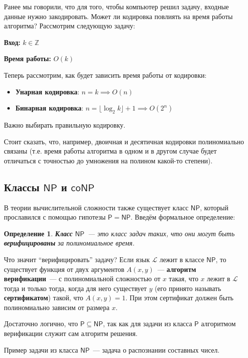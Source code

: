\documentclass[a4paper,12pt]{article}
\newtheorem{definition}{Определение}
\newcommand{\Pclass}{\mathsf{P}}
\newcommand{\NPclass}{\mathsf{NP}}
\newcommand{\coNPclass}{\mathsf{coNP}}
\begin{document}
Ранее мы говорили, что для того, чтобы компьютер решил задачу, входные данные нужно закодировать. Может ли кодировка повлиять на время работы алгоритма? Рассмотрим следующую задачу:

\textbf{Вход:} \(k \in \mathbb{Z}\)

\textbf{Время работы:} \(O(k)\)

Теперь рассмотрим, как будет зависить время работы от кодировки:
\begin{itemize}
\item \textbf{Унарная кодировка}: \(n = k \implies O(n)\)
\item \textbf{Бинарная кодировка}: \(n = \lfloor\log_2 k\rfloor + 1 \implies O(2^n)\)
\end{itemize}
Важно выбирать правильную кодировку. 

Стоит сказать, что, например, двоичная и десятичная кодировки полиномиально связаны (т.е. время работы алгоритма в одном и в другом случае будет отличаться с точностью до умножения на полином какой-то степени).

    \subsection{Классы \(\NPclass\) и \(\coNPclass\)}
    В теории вычислительной сложности также существует класс \(\NPclass\), который прославился с помощью гипотезы \(\Pclass = \NPclass\). Введём формальное определение:
    \begin{definition}
        \textbf{Класс} \(\NPclass\)~--- это класс задач таких, что они могут быть \textbf{верифицированы} за полиномиальное время.
    \end{definition}
    Что значит ``верифицировать'' задачу? Если язык \(\mathscr{L}\) лежит в классе \(\NPclass\), то существует функция от двух аргументов \(A(x, y)\)~--- \textbf{алгоритм верификации}~---  с полиномиальной сложностью от \(x\) такая, что \(x\) лежит в \(\mathscr{L}\) тогда и только тогда, когда для него существует \(y\) (его принято называть \textbf{сертификатом}) такой, что \(A(x, y) = 1\). При этом сертификат должен быть полиномиально зависим от размера \(x\).
    
    Достаточно логично, что \(\Pclass \subseteq \NPclass\), так как для задачи из класса \(\Pclass\) алгоритмом верификации служит сам алгоритм решения.
    
    Пример задачи из класса \(\NPclass\)~--- задача о распознании составных чисел.
    
\end{document}
